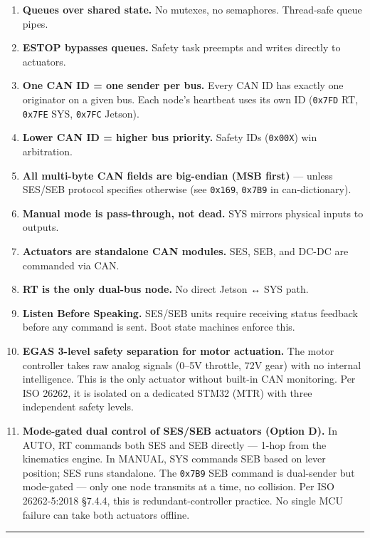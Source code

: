 \documentclass[12pt,a4paper,oneside]{report}
\providecommand{\tightlist}{\setlength{\itemsep}{0pt}\setlength{\parskip}{0pt}}
\begin{document}
\begin{enumerate}
\def\labelenumi{\arabic{enumi}.}
\tightlist
\item
  \textbf{Queues over shared state.} No mutexes, no semaphores. Thread-safe
  queue pipes.
\item
  \textbf{ESTOP bypasses queues.} Safety task preempts and writes directly to
  actuators.
\item
  \textbf{One CAN ID = one sender per bus.} Every CAN ID has exactly one
  originator on a given bus. Each node's heartbeat uses its own ID
  (\texttt{0x7FD} RT, \texttt{0x7FE} SYS, \texttt{0x7FC} Jetson).
\item
  \textbf{Lower CAN ID = higher bus priority.} Safety IDs (\texttt{0x00X}) win
  arbitration.
\item
  \textbf{All multi-byte CAN fields are big-endian (MSB first)} --- unless
  SES/SEB protocol specifies otherwise (see \texttt{0x169}, \texttt{0x7B9} in
  can-dictionary).
\item
  \textbf{Manual mode is pass-through, not dead.} SYS mirrors physical inputs to
  outputs.
\item
  \textbf{Actuators are standalone CAN modules.} SES, SEB, and DC-DC are
  commanded via CAN.
\item
  \textbf{RT is the only dual-bus node.} No direct Jetson ↔ SYS path.
\item
  \textbf{Listen Before Speaking.} SES/SEB units require receiving status
  feedback before any command is sent. Boot state machines enforce this.
\item
  \textbf{EGAS 3-level safety separation for motor actuation.} The motor
  controller takes raw analog signals (0--5V throttle, 72V gear) with no
  internal intelligence. This is the only actuator without built-in CAN
  monitoring. Per ISO 26262, it is isolated on a dedicated STM32 (MTR) with
  three independent safety levels.
\item
  \textbf{Mode-gated dual control of SES/SEB actuators (Option D).} In AUTO, RT
  commands both SES and SEB directly --- 1-hop from the kinematics engine. In
  MANUAL, SYS commands SEB based on lever position; SES runs standalone. The
  \texttt{0x7B9} SEB command is dual-sender but mode-gated --- only one node
  transmits at a time, no collision. Per ISO 26262-5:2018 §7.4.4, this is
  redundant-controller practice. No single MCU failure can take both actuators
  offline.
\end{enumerate}

\begin{center}\rule{0.5\linewidth}{0.5pt}\end{center}
\end{document}
